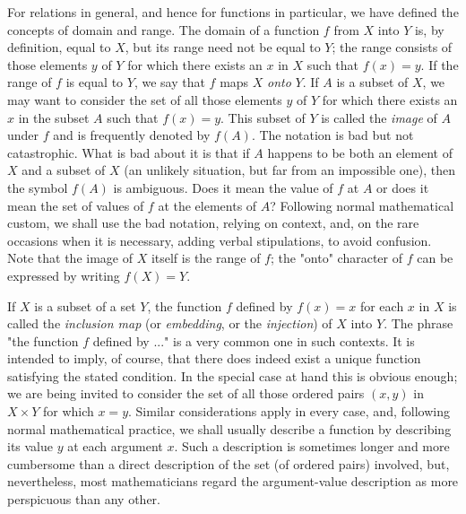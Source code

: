 For relations in general, and hence for functions in particular, we have defined the concepts of domain and range. The domain of a function $f$ from $X$ into $Y$ is, by definition, equal to $X$, but its range need not be equal to $Y$; the range consists of those elements $y$ of $Y$ for which there exists an $x$ in $X$ such that $f(x) = y$. If the range of $f$ is equal to $Y$, we say that $f$ maps $X$ \textit{onto} $Y$. If $A$ is a subset of $X$, we may want to consider the set of all those elements $y$ of $Y$ for which there exists an $x$ in the subset $A$ such that $f(x) = y$. This subset of $Y$ is called the \textit{image} of $A$ under $f$ and is frequently denoted by $f(A)$. The notation is bad but not catastrophic. What is bad about it is that if $A$ happens to be both an element of $X$ and a subset of $X$ (an unlikely situation, but far from an impossible one), then the symbol $f(A)$ is ambiguous. Does it mean the value of $f$ at $A$ or does it mean the set of values of $f$ at the elements of $A$?   Following normal mathematical custom, we shall use the bad notation, relying on context, and, on the rare occasions when it is necessary, adding verbal stipulations, to avoid confusion. Note that the image of $X$ itself is the range of $f$; the "onto" character of $f$ can be expressed by writing $f(X) = Y$. 

If $X$ is a subset of a set $Y$, the function $f$ defined by $f(x) = x$ for each $x$ in $X$ is called the \textit{inclusion map} (or \textit{embedding}, or the \textit{injection}) of $X$ into $Y$. The phrase "the function $f$ defined by ..." is a very common one in such contexts. It is intended to imply, of course, that there does indeed exist a unique function satisfying the stated condition. In the special case at hand this is obvious enough; we are being invited to consider the set of all those ordered pairs $(x, y)$ in $X \times Y$ for which $x = y$. Similar considerations apply in every case, and, following normal mathematical practice, we shall usually describe a function by describing its value $y$ at each argument $x$. Such a description is sometimes longer and more cumbersome than a direct description of the set (of ordered pairs) involved, but, nevertheless, most mathematicians regard the argument-value description as more perspicuous than any other. 


